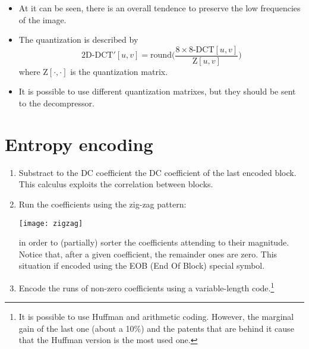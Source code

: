 \begin{itemize}
\item At it can be seen, there is an overall tendence to preserve the
  low frequencies of the image.

\newpage

\item The quantization is described by
  \begin{equation}
    \text{2D-DCT}'[u,v] = \text{round}\Big(\frac{8\times 8\text{-DCT}[u,v]}{\text{Z}[u,v]}\Big)
  \end{equation}
  where $\text{Z}[\cdot,\cdot]$ is the quantization matrix.
\item It is possible to use different quantization matrixes, but they
  should be sent to the decompressor.
\end{itemize}

\section{Entropy encoding}
\begin{enumerate}
\item Substract to the DC coefficient the DC coefficient of the last
  encoded block. This calculus exploits the correlation between
  blocks.
\item Run the coefficients using the zig-zag pattern:
  \begin{center}
    \texttt{[image: zigzag]}
  \end{center}
  in order to (partially) sorter the coefficients attending to their
  magnitude. Notice that, after a given coefficient, the remainder
  ones are zero. This situation if encoded using the EOB (End Of
  Block) special symbol.
\item Encode the runs of non-zero coefficients using a variable-length
  code.\footnote{It is possible to use Huffman and arithmetic
    coding. However, the marginal gain of the last one (about a 10\%)
    and the patents that are behind it cause that the Huffman version
    is the most used one.}
\end{enumerate}

